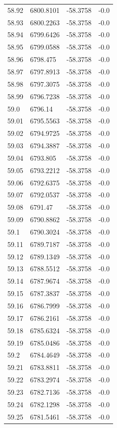 \begin{table}[H]
\begin{tabular}{llll}
58.92 & 6800.8101 & -58.3758 & -0.0 \\
58.93 & 6800.2263 & -58.3758 & -0.0 \\
58.94 & 6799.6426 & -58.3758 & -0.0 \\
58.95 & 6799.0588 & -58.3758 & -0.0 \\
58.96 & 6798.475 & -58.3758 & -0.0 \\
58.97 & 6797.8913 & -58.3758 & -0.0 \\
58.98 & 6797.3075 & -58.3758 & -0.0 \\
58.99 & 6796.7238 & -58.3758 & -0.0 \\
59.0 & 6796.14 & -58.3758 & -0.0 \\
59.01 & 6795.5563 & -58.3758 & -0.0 \\
59.02 & 6794.9725 & -58.3758 & -0.0 \\
59.03 & 6794.3887 & -58.3758 & -0.0 \\
59.04 & 6793.805 & -58.3758 & -0.0 \\
59.05 & 6793.2212 & -58.3758 & -0.0 \\
59.06 & 6792.6375 & -58.3758 & -0.0 \\
59.07 & 6792.0537 & -58.3758 & -0.0 \\
59.08 & 6791.47 & -58.3758 & -0.0 \\
59.09 & 6790.8862 & -58.3758 & -0.0 \\
59.1 & 6790.3024 & -58.3758 & -0.0 \\
59.11 & 6789.7187 & -58.3758 & -0.0 \\
59.12 & 6789.1349 & -58.3758 & -0.0 \\
59.13 & 6788.5512 & -58.3758 & -0.0 \\
59.14 & 6787.9674 & -58.3758 & -0.0 \\
59.15 & 6787.3837 & -58.3758 & -0.0 \\
59.16 & 6786.7999 & -58.3758 & -0.0 \\
59.17 & 6786.2161 & -58.3758 & -0.0 \\
59.18 & 6785.6324 & -58.3758 & -0.0 \\
59.19 & 6785.0486 & -58.3758 & -0.0 \\
59.2 & 6784.4649 & -58.3758 & -0.0 \\
59.21 & 6783.8811 & -58.3758 & -0.0 \\
59.22 & 6783.2974 & -58.3758 & -0.0 \\
59.23 & 6782.7136 & -58.3758 & -0.0 \\
59.24 & 6782.1298 & -58.3758 & -0.0 \\
59.25 & 6781.5461 & -58.3758 & -0.0 \\

\end{tabular}
\end{table}
